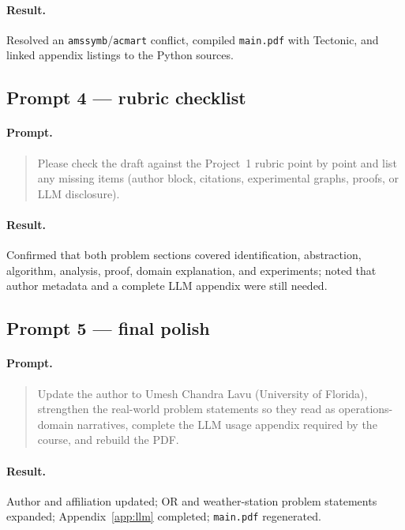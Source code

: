 \documentclass[sigconf,review=false]{acmart}
\theoremstyle{definition}
\begin{document}
\paragraph{Result.}
Resolved an \texttt{amssymb}/\texttt{acmart} conflict, compiled
\texttt{main.pdf} with Tectonic, and linked appendix listings to the
Python sources.

\subsection{Prompt 4 --- rubric checklist}
\paragraph{Prompt.}
\begin{quote}
Please check the draft against the Project~1 rubric point by point and
list any missing items (author block, citations, experimental graphs,
proofs, or LLM disclosure).
\end{quote}

\paragraph{Result.}
Confirmed that both problem sections covered identification, abstraction,
algorithm, analysis, proof, domain explanation, and experiments; noted
that author metadata and a complete LLM appendix were still needed.

\subsection{Prompt 5 --- final polish}
\paragraph{Prompt.}
\begin{quote}
Update the author to Umesh Chandra Lavu (University of Florida), strengthen
the real-world problem statements so they read as operations-domain
narratives, complete the LLM usage appendix required by the course, and
rebuild the PDF.
\end{quote}

\paragraph{Result.}
Author and affiliation updated; OR and weather-station problem statements
expanded; Appendix~\ref{app:llm} completed; \texttt{main.pdf} regenerated.
\end{document}
